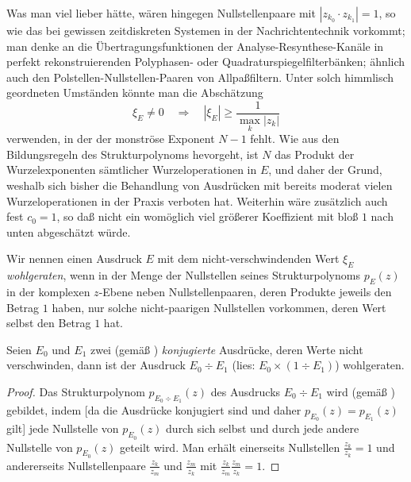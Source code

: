 \begin{remark}[Aufgabenstellung]
Was man viel lieber hätte,
wären hingegen Nullstellenpaare mit $|z_{k_0}\cdot z_{k_1}|=1$,
 so wie das bei gewissen zeitdiskreten Systemen
 in der Nachrichtentechnik vorkommt;
 man denke an die Übertragungsfunktionen 
 der Analyse-Resynthese-Kanäle
 in perfekt rekonstruierenden Polyphasen-
 oder Quadraturspiegelfilterbänken;
 ähnlich auch den Polstellen-Nullstellen-Paaren von Allpaßfiltern.
Unter solch himmlisch geordneten Umständen könnte man die Abschätzung
\begin{equation}\label{eq:Nulltrennungsschranke}
  \xi_E\ne0
  \quad\Rightarrow\quad
  |\xi_E|
  \ge
  \frac{1}{\max_k|z_k|}
\end{equation}
verwenden, in der der monströse Exponent $N-1$ fehlt.
Wie aus den Bildungsregeln des Strukturpolynoms hevorgeht,
ist $N$ das Produkt der Wurzelexponenten 
sämtlicher Wurzeloperationen in $E$,
und daher der Grund,
weshalb sich bisher die Behandlung von Ausdrücken 
mit bereits moderat vielen Wurzeloperationen 
in der Praxis verboten hat.
Weiterhin wäre zusätzlich auch fest $c_0=1$,
so daß nicht ein womöglich viel größerer Koeffizient
mit bloß $1$ nach unten abgeschätzt würde.
\end{remark}


\begin{definition}
Wir nennen einen Ausdruck $E$ 
mit dem nicht-verschwindenden Wert $\xi_E$ {\em wohlgeraten},
wenn in der Menge der Nullstellen
seines Strukturpolynoms $p_E(z)$
in der komplexen $z$-Ebene 
neben Nullstellenpaaren, 
deren Produkte jeweils den Betrag $1$ haben,
nur solche nicht-paarigen Nullstellen vorkommen,
deren Wert selbst den Betrag $1$ hat.
\end{definition}


\begin{theorem}[Hauptsatz]\label{th:Hauptsatz}
Seien $E_0$ und $E_1$ zwei 
(gemäß )
{\em konjugierte} Ausdrücke,
deren Werte nicht verschwinden,
dann ist der Ausdruck
$E_0\div E_1$ (lies: $E_0\times(1 \div E_1)$) wohlgeraten.
\begin{proof}
Das Strukturpolynom $p_{E_0\div E_1}(z)$
des Ausdrucks $E_0\div E_1$ wird 
(gemäß ) gebildet,
indem [da die Ausdrücke konjugiert sind 
und daher $p_{E_0}(z)=p_{E_1}(z)$ gilt]
jede Nullstelle von $p_{E_0}(z)$
durch sich selbst und durch 
jede andere Nullstelle von $p_{E_0}(z)$
geteilt wird.
Man erhält einerseits Nullstellen $\frac{z_{k}}{z_{k}}=1$
und andererseits Nullstellenpaare
$\frac{z_{k}}{z_{m}}$ und $\frac{z_{m}}{z_{k}}$
mit $\frac{z_{k}}{z_{m}}\frac{z_{m}}{z_{k}}=1$.
\end{proof}
\end{theorem}



